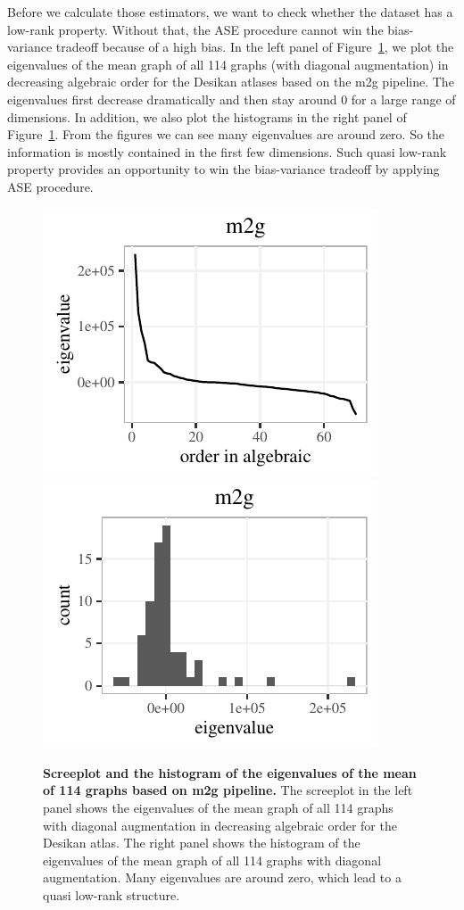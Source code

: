 \documentclass[a4paper]{article}
\begin{document}
Before we calculate those estimators, we want to check whether the dataset has a low-rank property. Without that, the ASE procedure cannot win the bias-variance tradeoff because of a high bias. In the left panel of Figure~\ref{fig:screehist}, we plot the eigenvalues of the mean graph of all 114 graphs (with diagonal augmentation) in decreasing algebraic order for the Desikan atlases based on the m2g pipeline. The eigenvalues first decrease dramatically and then stay around 0 for a large range of dimensions. In addition, we also plot the histograms in the right panel of Figure~\ref{fig:screehist}. From the figures we can see many eigenvalues are around zero. So the information is mostly contained in the first few dimensions. Such quasi low-rank property provides an opportunity to win the bias-variance tradeoff by applying ASE procedure.

\begin{figure}[!htbp]
\centering
\includegraphics[height=.22\textheight]{screeplot_m2g.pdf}
\includegraphics[height=.22\textheight]{hist_m2g.pdf}
\caption{{\bf Screeplot and the histogram of the eigenvalues of the  mean of 114 graphs based on m2g pipeline.}
The screeplot in the left panel shows the eigenvalues of the mean graph of all 114 graphs with diagonal augmentation in decreasing algebraic order for the Desikan atlas. The right panel shows the histogram of the eigenvalues of the mean graph of all 114 graphs with diagonal augmentation. Many eigenvalues are around zero, which lead to a quasi low-rank structure.
}
\label{fig:screehist}
\end{figure}
\end{document}
